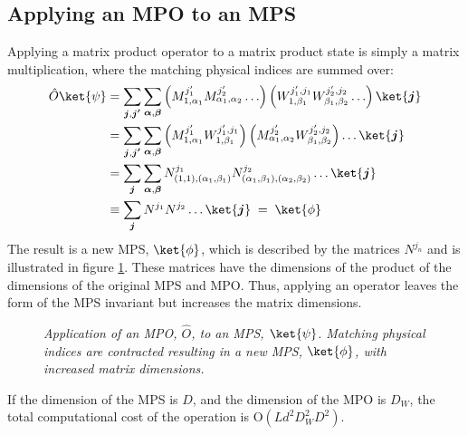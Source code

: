 \subsection{Applying an MPO to an MPS}
Applying a matrix product operator to a matrix product state is simply a matrix multiplication, where the matching physical indices are summed over:
\begin{align}
	\hat{O} \ket{\psi} &=  \sum_{\boldsymbol{j},\boldsymbol{j'}} \sum_{\boldsymbol{\alpha},\boldsymbol{\beta}} \left( M_{1, \alpha_1}^{ j_1 '} M_{\alpha_1, \alpha_2}^{j_2 '} \ldots \right) \left( W_{1, \beta_1}^{j_1 ' , j_1 } W_{\beta_1, \beta_2}^{j_2 ', j_2 } \ldots \right) \ket{\boldsymbol{j}} \nonumber \\
&= \sum_{\boldsymbol{j},\boldsymbol{j'}} \sum_{\boldsymbol{\alpha},\boldsymbol{\beta}} \left( M_{1, \alpha_1}^{ j_1 '} W_{1, \beta_1}^{j_1 ' , j_1} \right) \left( M_{\alpha_1, \alpha_2}^{j_2 '}  W_{\beta_1, \beta_2}^{j_2 ' , j_2} \right) \ldots \ket{\boldsymbol{j}} \nonumber \\
&= \sum_{\boldsymbol{j}} \sum_{\boldsymbol{\alpha},\boldsymbol{\beta}} N_{(1,1),(\alpha_1 , \beta_1)}^{j_1} N_{(\alpha_1 , \beta_1),(\alpha_2 , \beta_2)}^{j_2} \ldots \ket{\boldsymbol{j}} \nonumber \\
&\equiv \sum_{\boldsymbol{j}} N^{j_1} N^{j_2} \ldots \ket{\boldsymbol{j}} \; = \; \ket{\phi}
\label{eq:optBracketsMPO}
\end{align} 
The result is a new MPS, $\ket{\phi}$, which is described by the matrices $N^{j_n}$ and is illustrated in figure \ref{fig:MPOcont}. These matrices have the dimensions of the product of the dimensions of the original MPS and MPO. Thus, applying an operator leaves the form of the MPS invariant but increases the matrix dimensions.
\begin{figure}[h!]
	\centering
	
	\caption{\textit{Application of an MPO, $\hat{O}$, to an MPS, $\ket{\psi}$. Matching physical indices are contracted resulting in a new MPS, $\ket{\phi}$, with increased matrix dimensions.}}
	\label{fig:MPOcont}
\end{figure}
If the dimension of the MPS is $D$, and the dimension of the MPO is $D_W$, the total computational cost of the operation is $\mathrm{O}(L d^2 D_W ^2 D^2)$.\cite{schollwock, McCulloch2007}

